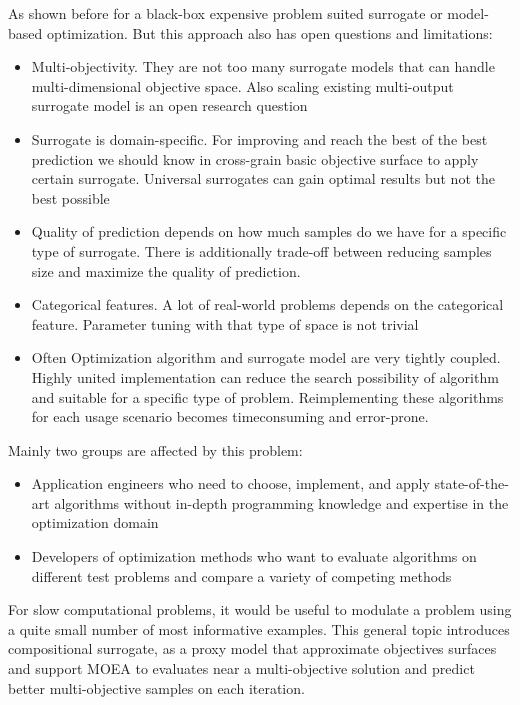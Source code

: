     As shown before for a black-box expensive problem suited surrogate or model-based optimization. But this approach also has open questions and limitations:
    \begin{itemize}
        \item Multi-objectivity. They are not too many surrogate models that can handle multi-dimensional objective space. Also scaling existing multi-output surrogate model is an open research question
        \item Surrogate is domain-specific. For improving and reach the best of the best prediction we should know in cross-grain basic objective surface to apply certain surrogate. Universal surrogates can gain optimal results but not the best possible
        \item Quality of prediction depends on how much samples do we have for a specific type of surrogate. There is additionally trade-off between reducing samples size and maximize the quality of prediction.
        \item Categorical features. A lot of real-world problems depends on the categorical feature. Parameter tuning with that type of space is not trivial
        \item Often Optimization algorithm and surrogate model are very tightly coupled. Highly united implementation can reduce the search possibility of algorithm and suitable for a specific type of problem. Reimplementing these algorithms for each usage scenario becomes timeconsuming and error-prone.
    \end{itemize}

    Mainly two groups are affected by this problem:
    \begin{itemize}
        \item Application engineers who need to choose, implement, and apply state-of-the-art algorithms without in-depth programming knowledge and expertise in the optimization domain
        \item Developers of optimization methods who want to evaluate algorithms on different test problems and compare a variety of competing methods
    \end{itemize}

    For slow computational problems, it would be useful to modulate a problem using a quite small number of most informative examples. This general topic introduces compositional surrogate, as a proxy model that approximate objectives surfaces and support MOEA to evaluates near a multi-objective solution and predict better multi-objective samples on each iteration.


